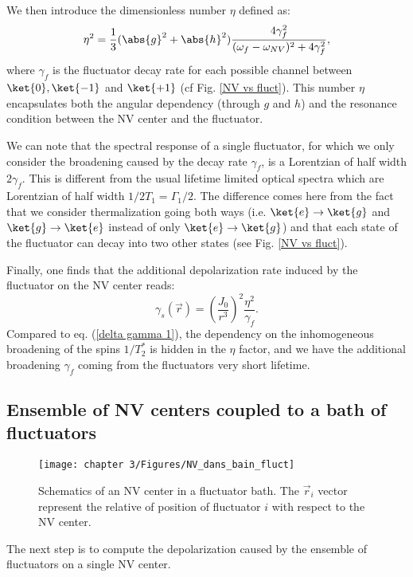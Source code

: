 \documentclass[a4paper, 11pt]{report}
\begin{document}
We then introduce the dimensionless number $\eta$ defined as:
\begin{equation}
\label{eq eta}
\eta^2=\frac{1}{3} (\abs{g}^2+\abs{h}^2) \frac{4\gamma_f^2}{(\omega_f - \omega_{NV})^2+4\gamma_f^2},
\end{equation}
where $\gamma_f$ is the fluctuator decay rate for each possible channel between $\ket{0}, \ket{-1}$ and $\ket{+1}$ (cf Fig. \ref{NV vs fluct}). This number $\eta$ encapsulates both the angular dependency (through $g$ and $h$) and the resonance condition between the NV center and the fluctuator.

We can note that the spectral response of a single fluctuator, for which we only consider the broadening caused by the decay rate $\gamma_f$, is a Lorentzian of half width $2\gamma_f$. This is different from the usual lifetime limited optical spectra which are Lorentzian of half width $1/2T_1=\Gamma_1/2$. The difference comes here from the fact that we consider thermalization going both ways (i.e. $\ket{e} \to \ket{g}$ and $\ket{g} \to \ket{e}$ instead of only $\ket{e} \to \ket{g}$) and that each state of the fluctuator can decay into two other states (see Fig. \ref{NV vs fluct}).

Finally, one finds that the additional depolarization rate induced by the fluctuator on the NV center reads:
\begin{equation}
\gamma_s(\vec{r})=\left(\frac{J_0}{r^3}\right)^2 \frac{\eta^2}{\gamma_f}.
\end{equation}
Compared to eq. (\ref{delta gamma 1}), the dependency on the inhomogeneous broadening of the spins $1/T_2^*$ is hidden in the $\eta$ factor, and we have the additional broadening $\gamma_f$ coming from the fluctuators very short lifetime.

\subsection{Ensemble of NV centers coupled to a bath of fluctuators}

\begin{figure}[h]
\centering
\texttt{[image: chapter 3/Figures/NV\_dans\_bain\_fluct]}
\caption{Schematics of an NV center in a fluctuator bath. The $\vec{r}_i$ vector represent the relative of position of fluctuator $i$ with respect to the NV center.}
\label{NV + bain fluct}
\end{figure}

The next step is to compute the depolarization caused by the ensemble of fluctuators on a single NV center.
\end{document}
